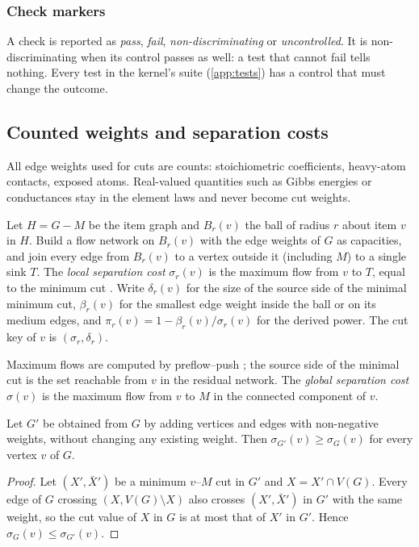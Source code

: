 \subsubsection{Check markers}
\label{sec:checks}

A check is reported as \emph{pass}, \emph{fail}, \emph{non-discriminating} or \emph{uncontrolled}.
It is non-discriminating when its control passes as well: a test that cannot fail tells nothing.
Every test in the kernel's suite (\cref{app:tests}) has a control that must change the outcome.

\subsection{Counted weights and separation costs}
\label{sec:cuts}

All edge weights used for cuts are counts: stoichiometric coefficients, heavy-atom contacts, exposed atoms.
Real-valued quantities such as Gibbs energies or conductances stay in the element laws and never become cut weights.

\begin{definition}
\label{def:cutkey}
Let $H=G-M$ be the item graph and $B_r(v)$ the ball of radius $r$ about item $v$ in $H$.
Build a flow network on $B_r(v)$ with the edge weights of $G$ as capacities, and join every edge from $B_r(v)$ to a vertex outside it (including $M$) to a single sink $T$.
The \emph{local separation cost} $\sigma_r(v)$ is the maximum flow from $v$ to $T$, equal to the minimum cut \citep{ford1956maximal}.
Write $\delta_r(v)$ for the size of the source side of the minimal minimum cut, $\beta_r(v)$ for the smallest edge weight inside the ball or on its medium edges, and $\pi_r(v)=1-\beta_r(v)/\sigma_r(v)$ for the derived power.
The cut key of $v$ is $(\sigma_r,\delta_r)$.
\end{definition}

Maximum flows are computed by preflow--push \citep{goldberg1988preflow}; the source side of the minimal cut is the set reachable from $v$ in the residual network.
The \emph{global separation cost} $\sigma(v)$ is the maximum flow from $v$ to $M$ in the connected component of $v$.

\begin{proposition}
\label{prop:monotone}
Let $G'$ be obtained from $G$ by adding vertices and edges with non-negative weights, without changing any existing weight.
Then $\sigma_{G'}(v)\ge\sigma_G(v)$ for every vertex $v$ of $G$.
\end{proposition}
\begin{proof}
Let $(X',\bar X')$ be a minimum $v$--$M$ cut in $G'$ and $X=X'\cap V(G)$.
Every edge of $G$ crossing $(X,V(G)\setminus X)$ also crosses $(X',\bar X')$ in $G'$ with the same weight, so the cut value of $X$ in $G$ is at most that of $X'$ in $G'$.
Hence $\sigma_G(v)\le\sigma_{G'}(v)$.
\end{proof}

